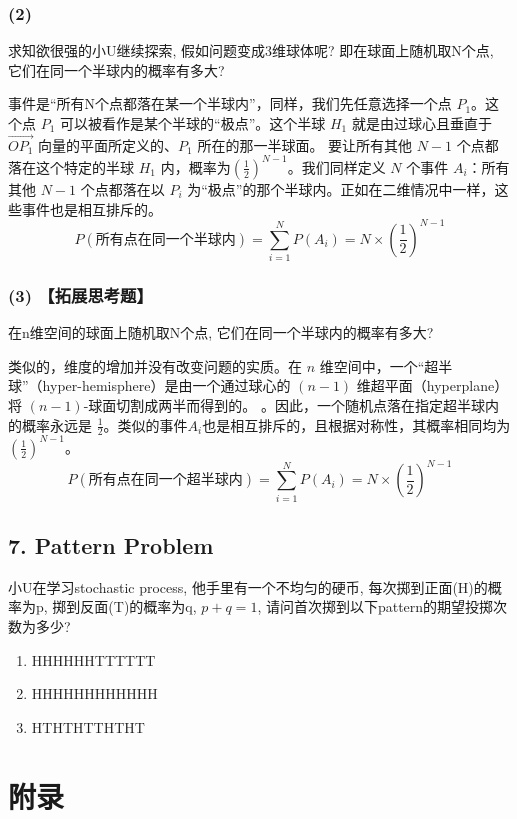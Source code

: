 \documentclass[UTF8]{ctexart}
\begin{document}
\subsubsection*{(2)}
求知欲很强的小U继续探索, 假如问题变成3维球体呢? 即在球面上随机取N个点, 它们在同一个半球内的概率有多大?

事件是“所有N个点都落在某一个半球内”，同样，我们先任意选择一个点 $P_1$。这个点 $P_1$ 可以被看作是某个半球的“极点”。这个半球 $H_1$ 就是由过球心且垂直于 $\vec{OP_1}$ 向量的平面所定义的、$P_1$ 所在的那一半球面。
要让所有其他 $N-1$ 个点都落在这个特定的半球 $H_1$ 内，概率为$(\frac{1}{2})^{N-1}$。我们同样定义 $N$ 个事件 $A_i$：所有其他 $N-1$ 个点都落在以 $P_i$ 为“极点”的那个半球内。正如在二维情况中一样，这些事件也是相互排斥的。
$$ P(\text{所有点在同一个半球内}) = \sum_{i=1}^{N} P(A_i) = N \times \left(\frac{1}{2}\right)^{N-1} $$
\subsubsection*{(3) 【拓展思考题】}
在n维空间的球面上随机取N个点, 它们在同一个半球内的概率有多大?

类似的，维度的增加并没有改变问题的实质。在 $n$ 维空间中，一个“超半球”（hyper-hemisphere）是由一个通过球心的 $(n-1)$ 维超平面（hyperplane）将 $(n-1)$-球面切割成两半而得到的。
。因此，一个随机点落在指定超半球内的概率永远是 $\frac{1}{2}$。类似的事件$A_i$也是相互排斥的，且根据对称性，其概率相同均为$(\frac{1}{2})^{N-1}$。
$$ P(\text{所有点在同一个超半球内}) = \sum_{i=1}^{N} P(A_i) = N \times \left(\frac{1}{2}\right)^{N-1} $$
\subsection*{7. Pattern Problem}
小U在学习stochastic process, 他手里有一个不均匀的硬币, 每次掷到正面(H)的概率为p, 掷到反面(T)的概率为q, $p+q=1$, 请问首次掷到以下pattern的期望投掷次数为多少?
\begin{enumerate}
    \item HHHHHHTTTTTT
    \item HHHHHHHHHHHH
    \item HTHTHTTHTHT
\end{enumerate}



\section*{附录}
\end{document}
